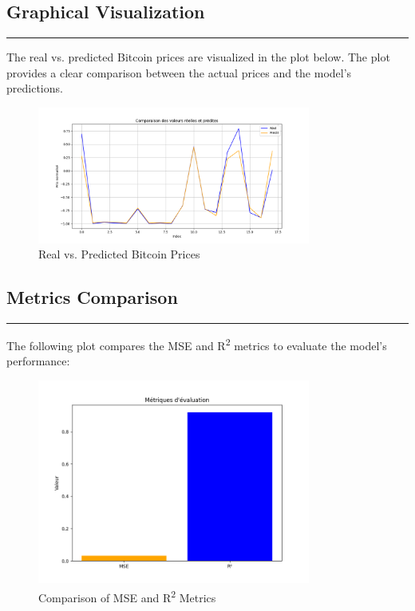 \documentclass{article}
\begin{document}
\subsection{Graphical Visualization}
\noindent\rule{\textwidth}{1pt} %
The real vs. predicted Bitcoin prices are visualized in the plot below. The plot provides a clear comparison between the actual prices and the model's predictions.

\begin{figure}[h]
    \centering
    \includegraphics[width=0.8\textwidth]{img/Prediction.png}
    \caption{Real vs. Predicted Bitcoin Prices} %
    \label{fig:predictions}
\end{figure}

\subsection{Metrics Comparison}
\noindent\rule{\textwidth}{1pt} %
The following plot compares the MSE and R\textsuperscript{2} metrics to evaluate the model's performance:
\begin{figure}[h]
    \centering
    \includegraphics[width=0.8\textwidth]{img/metrics_plot.png}
    \caption{Comparison of MSE and R\textsuperscript{2} Metrics} %
    \label{fig:metrics}
\end{figure}
\end{document}
